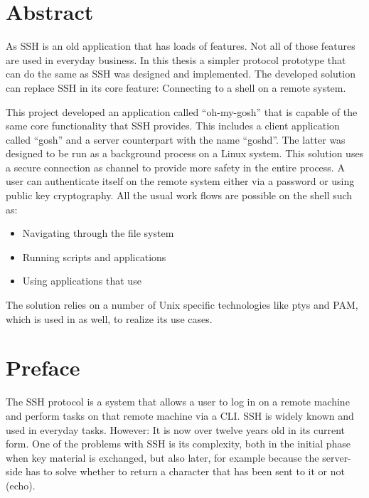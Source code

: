 \documentclass[10pt,a4paper,titlepage,twoside,english,final]{zhawreprt}
\begin{document}
\maketitle

\chapter*{Abstract}\label{sec:Abstract}
As \gls{SSH} is an old application that has loads of features.
Not all of those features are used in everyday business.
In this thesis a simpler protocol prototype that can do the same as \gls{SSH} was designed and implemented.
The developed solution can replace \gls{SSH} in its core feature:
Connecting to a \gls{shell} on a remote system.

This project developed an application called ``oh-my-gosh'' that is capable of the same core functionality that \gls{SSH} provides. This includes a client application called ``gosh'' and a server counterpart with the name ``goshd''.
The latter was designed to be run as a background process on a \gls{Linux} system.
This solution uses a secure connection as channel to provide more safety in the entire process.
A user can authenticate itself on the remote system either via a password or using public key cryptography.
All the usual work flows are possible on the \gls{shell} such as:

\begin{itemize}
\item Navigating through the file system
\item Running scripts and applications
\item Using applications that use \cite{ncurses}
\end{itemize}

The solution relies on a number of \gls{Unix} specific technologies like \glspl{pty} and \gls{PAM}, which is used in \cite{login} as well, to realize its use cases.



\chapter*{Preface}\label{sec:Preface}
The \gls{SSH} protocol \citep{rfc253,rfc6668,rfc8268,rfc8308,rfc8332} is a system that allows a user to log in on a remote machine and perform tasks on that remote machine via a \gls{CLI}.
\gls{SSH} is widely known and used in everyday tasks.
However: It is now over twelve years old in its current form.
One of the problems with \gls{SSH} is its complexity, both in the initial phase when key material is exchanged, but also later, for example because the server-side has to solve whether to return a character that has been sent to it or not (echo).
\end{document}
